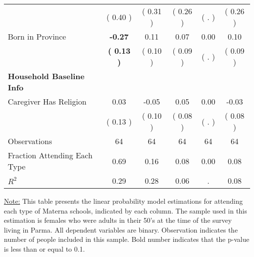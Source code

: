 \begin{table}[H]
{\begin{tabular}{lccccc}
\quad  & (     0.40 ) & (     0.31 )  & (     0.26 )  & (        . ) & (     0.26 ) \\
\quad Born in Province & \textbf{    -0.27} &      0.11 &      0.07 &      0.00 &      0.10 \\
\quad  & \textbf{(     0.13 )} & (     0.10 )  & (     0.09 )  & (        . ) & (     0.09 ) \\
\midrule
\textbf{Household Baseline Info} \\
\quad Caregiver Has Religion &      0.03 &     -0.05 &      0.05 &      0.00 &     -0.03 \\
\quad  & (     0.13 ) & (     0.10 )  & (     0.08 )  & (        . ) & (     0.08 ) \\
\midrule
Observations & 64 & 64 & 64 & 64 & 64 \\
Fraction Attending Each Type &      0.69 &      0.16 &      0.08 &      0.00 &      0.08 \\
\midrule
$ R^2$ &      0.29 &      0.28 &      0.06 &         . &      0.08 \\
\bottomrule
\end{tabular}}
\end{table}
\begin{footnotesize}
\noindent\underline{Note:} This table presents the linear probability model estimations for attending each type of Materna schools, indicated by each column. The sample used in this estimation is females who were adults in their 50's at the time of the survey living in Parma. All dependent variables are binary. Observation indicates the number of people included in this sample. Bold number indicates that the p-value is less than or equal to 0.1.
\end{footnotesize}
